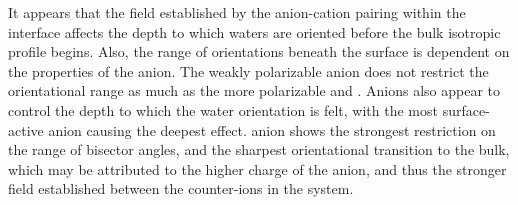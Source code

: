 It appears that the field established by the anion-cation pairing within the interface affects the depth to which waters are oriented before the bulk isotropic profile begins. Also, the range of orientations beneath the surface is dependent on the properties of the anion. The weakly polarizable \cl anion does not restrict the orientational range as much as the more polarizable \nit and \sul. Anions also appear to control the depth to which the water orientation is felt, with the most surface-active \nit anion causing the deepest effect. \sul anion shows the strongest restriction on the range of bisector angles, and the sharpest orientational transition to the bulk, which may be attributed to the higher charge of the anion, and thus the stronger field established between the counter-ions in the system.



\newcommand{\phiprof}{$\phi$-profile~}

